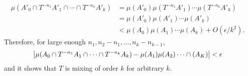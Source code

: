 \documentclass[12pt]{article}
\newenvironment{problem}[2][Problem]{\begin{trivlist}
\item[\hskip \labelsep {\bfseries #1}\hskip \labelsep {\bfseries #2.}]}{\end{trivlist}}
\begin{document}
\begin{equation*}
\begin{split}
    \mu(A'_0\cap T^{-n_1}A'_1\cap\cdots\cap T^{-n_k}A'_k)&=\mu(A'_0)\mu( T^{-n_1}A'_1)\cdots\mu(T^{-n_k}A'_k)\\
    &=\mu(A'_0)\mu( A'_1)\cdots\mu(A'_k)\\
    &<\mu(A_0)\mu(A_1)\cdots\mu(A_k)+O(\epsilon/k^2).
    \end{split}
\end{equation*} Therefore, for large enough $n_1, n_2-n_1, \ldots, n_k-n_{k-1}$,
\begin{equation*}
    \abs{\mu(A_0\cap T^{-n_1}A_1\cap\cdots\cap T^{-n_k}A_k)-\mu(A_1)\mu (A_2)\cdots \cap(A_K)}<\epsilon
\end{equation*} and it shows that $T$ is mixing of order $k$ for arbitrary $k$.

\begin{problem}{7}
\end{problem}
\end{document}
